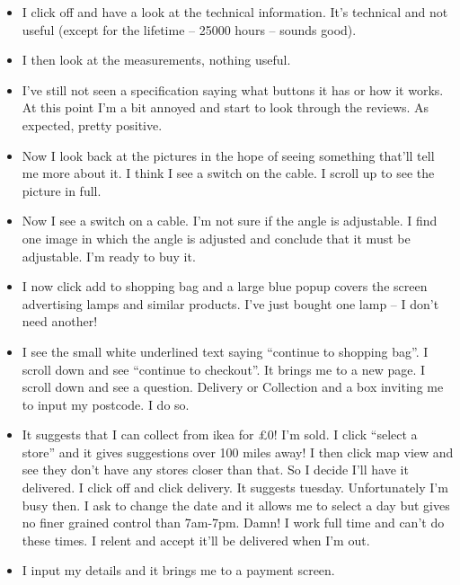 \documentclass[10pt,\jkfside,a4paper]{article}
\begin{document}
\begin{enumerate}
\begin{itemize}
\item I click off and have a look at the technical information. It's technical and not
useful (except for the lifetime -- 25000 hours -- sounds good).

\item I then look at the measurements, nothing useful.

\item I've still not seen a specification saying what buttons it has or how it works.
At this point I'm a bit annoyed and start to look through the reviews. As expected,
pretty positive.

\item Now I look back at the pictures in the hope of seeing something that'll tell me
more about it. I think I see a switch on the cable. I scroll up to see the picture in full.

\item Now I see a switch on a cable. I'm not sure if the angle is adjustable. I find
one image in which the angle is adjusted and conclude that it must be adjustable. I'm ready
to buy it.

\item I now click add to shopping bag and a large blue popup covers the screen advertising
lamps and similar products. I've just bought one lamp -- I don't need another!

\item I see the small white underlined text saying ``continue to shopping bag''.
I scroll down and see ``continue to checkout''. It brings me to a new page. I scroll down
and see a question. Delivery or Collection and a box inviting me to input my postcode.
I do so.

\item It suggests that I can collect from ikea for \pounds 0! I'm sold. I
click ``select a store'' and it gives suggestions over 100 miles away! I then
click map view and see they don't have any stores closer than that. So I decide
I'll have it delivered. I click off and click delivery. It suggests tuesday.
Unfortunately I'm busy then. I ask to change the date and it allows me to select
a day but gives no finer grained control than 7am-7pm. Damn! I work full time and
can't do these times. I relent and accept it'll be delivered when I'm out.

\item I input my details and it brings me to a payment screen.

\end{itemize}


\end{enumerate}
\end{document}
